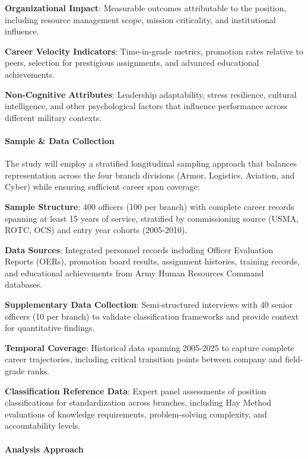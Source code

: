 \documentclass[./main.tex]{subfiles}
\begin{document}
\textbf{Organizational Impact}: Measurable outcomes attributable to the
position, including resource management scope, mission criticality, and
institutional influence.

\textbf{Career Velocity Indicators}: Time-in-grade metrics, promotion
rates relative to peers, selection for prestigious assignments, and
advanced educational achievements.

\textbf{Non-Cognitive Attributes}: Leadership adaptability, stress
resilience, cultural intelligence, and other psychological factors that
influence performance across different military contexts.

\paragraph{Sample \& Data Collection}\label{sample-data-collection}

The study will employ a stratified longitudinal sampling approach that
balances representation across the four branch divisions (Armor,
Logistics, Aviation, and Cyber) while ensuring sufficient career span
coverage:

\textbf{Sample Structure}: 400 officers (100 per branch) with complete
career records spanning at least 15 years of service, stratified by
commissioning source (USMA, ROTC, OCS) and entry year cohorts
(2005-2010).

\textbf{Data Sources}: Integrated personnel records including Officer
Evaluation Reports (OERs), promotion board results, assignment
histories, training records, and educational achievements from Army
Human Resources Command databases.

\textbf{Supplementary Data Collection}: Semi-structured interviews with
40 senior officers (10 per branch) to validate classification frameworks
and provide context for quantitative findings.

\textbf{Temporal Coverage}: Historical data spanning 2005-2025 to
capture complete career trajectories, including critical transition
points between company and field-grade ranks.

\textbf{Classification Reference Data}: Expert panel assessments of
position classifications for standardization across branches, including
Hay Method evaluations of knowledge requirements, problem-solving
complexity, and accountability levels.

\paragraph{Analysis Approach}\label{analysis-approach}
\end{document}
